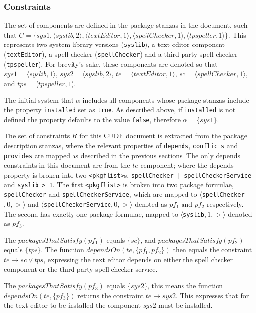 \subsubsection{Constraints}

The set of components are defined in the package stanzas in the document,
such that $C = \{sys1, \langle syslib,2\rangle, \langle textEditor,1\rangle, \langle spellChecker,1\rangle, \langle tpspeller,1\rangle\}$.
This represents two system library versions (\verb+syslib+), a text editor component (\verb+textEditor+), a spell checker (\verb+spellChecker+) and a third party spell checker (\verb+tpspeller+).
For brevity's sake, these components are denoted so that $sys1 = \langle syslib,1\rangle$, $sys2 = \langle syslib,2\rangle$, $te = \langle textEditor,1\rangle$, $sc = \langle spellChecker,1\rangle$,
and $tps = \langle tpspeller,1\rangle$.

The initial system that $\alpha$ includes all components whose package stanzas include the property \verb+installed+ set as \verb+true+.
As described above, if \verb+installed+ is not defined the property defaults to the value \verb+false+,
therefore $\alpha = \{ sys1 \}$.

The set of constraints $R$ for this CUDF document is extracted from the package description stanzas, where the relevant properties of \verb+depends+, \verb+conflicts+ and \verb+provides+ are
mapped as described in the previous sections. 
The only depends constraints in this document are from the $te$ component;
where the depends property is broken into two \verb+<pkgflist>+s, \verb+spellChecker | spellCheckerService+ and \verb+syslib > 1+.
The first \verb+<pkgflist>+ is broken into two package formulae, \verb+spellChecker+  and \verb+spellCheckerService+,
which are mapped to $\langle $\verb+spellChecker+$,0,>\rangle$ and $\langle $\verb+spellCheckerService+$,0,>\rangle$ denoted as $pf_1$ and $pf_2$ respectively.
The second has exactly one package formulae, mapped to $\langle $\verb+syslib+$,1,>\rangle$ denoted as $pf_3$.

The $packagesThatSatisfy(pf_1)$ equals $\{sc\}$, and $packagesThatSatisfy(pf_2)$ equals $\{tps\}$.
The function $dependsOn(te , \{pf_1,pf_2\} )$ 
then equals the constraint $te \rightarrow sc \vee tps$,
expressing the text editor depends on either the spell checker component or the third party spell checker service.

The $packagesThatSatisfy(pf_3)$ equals $\{sys2\}$,
this means the function  $dependsOn(te , \{pf_3\} )$ returns the constraint  $te \rightarrow sys2$.
This expresses that for the text editor to be installed the component $sys2$ must be installed.

